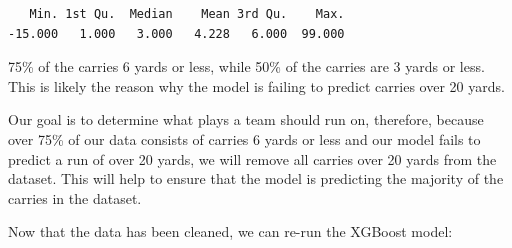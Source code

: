 \documentclass[
  super,
  preprint,
  3p]{elsarticle}
\newenvironment{Shaded}{\begin{snugshade}}{\end{snugshade}}
\newcommand{\CommentTok}[1]{\textcolor[rgb]{0.37,0.37,0.37}{#1}}
\newcommand{\ControlFlowTok}[1]{\textcolor[rgb]{0.00,0.23,0.31}{#1}}
\newcommand{\DecValTok}[1]{\textcolor[rgb]{0.68,0.00,0.00}{#1}}
\newcommand{\FloatTok}[1]{\textcolor[rgb]{0.68,0.00,0.00}{#1}}
\newcommand{\FunctionTok}[1]{\textcolor[rgb]{0.28,0.35,0.67}{#1}}
\newcommand{\NormalTok}[1]{\textcolor[rgb]{0.00,0.23,0.31}{#1}}
\newcommand{\OtherTok}[1]{\textcolor[rgb]{0.00,0.23,0.31}{#1}}
\newcommand{\SpecialCharTok}[1]{\textcolor[rgb]{0.37,0.37,0.37}{#1}}
\begin{document}
\begin{verbatim}
   Min. 1st Qu.  Median    Mean 3rd Qu.    Max. 
-15.000   1.000   3.000   4.228   6.000  99.000 
\end{verbatim}

75\% of the carries 6 yards or less, while 50\% of the carries are 3
yards or less. This is likely the reason why the model is failing to
predict carries over 20 yards.

Our goal is to determine what plays a team should run on, therefore,
because over 75\% of our data consists of carries 6 yards or less and
our model fails to predict a run of over 20 yards, we will remove all
carries over 20 yards from the dataset. This will help to ensure that
the model is predicting the majority of the carries in the dataset.

\begin{Shaded}
\end{Shaded}

Now that the data has been cleaned, we can re-run the XGBoost model:

\begin{Shaded}
\end{Shaded}
\end{document}
